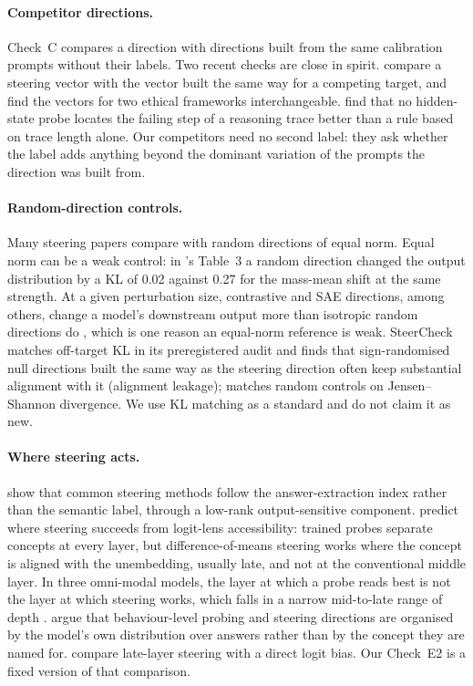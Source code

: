 \documentclass[11pt]{article}
\begin{document}
\paragraph{Competitor directions.} Check~C compares a direction with directions built from the same calibration prompts without their labels. Two recent checks are close in spirit. \citet{xu2026competing} compare a steering vector with the vector built the same way for a competing target, and find the vectors for two ethical frameworks interchangeable. \citet{subhnil2026failures} find that no hidden-state probe locates the failing step of a reasoning trace better than a rule based on trace length alone. Our competitors need no second label: they ask whether the label adds anything beyond the dominant variation of the prompts the direction was built from.

\paragraph{Random-direction controls.} Many steering papers compare with random directions of equal norm. Equal norm can be a weak control: in \citet{li2023iti}'s Table~3 a random direction changed the output distribution by a KL of 0.02 against 0.27 for the mass-mean shift at the same strength. At a given perturbation size, contrastive and SAE directions, among others, change a model's downstream output more than isotropic random directions do \citep{ferreiradasilva2026error}, which is one reason an equal-norm reference is weak. SteerCheck \citep{luo2026steercheck} matches off-target KL in its preregistered audit and finds that sign-randomised null directions built the same way as the steering direction often keep substantial alignment with it (alignment leakage); \citet{ferrara2026introspection} matches random controls on Jensen--Shannon divergence. We use KL matching as a standard and do not claim it as new.

\paragraph{Where steering acts.} \citet{gao2026steering} show that common steering methods follow the answer-extraction index rather than the semantic label, through a low-rank output-sensitive component. \citet{billa2026lap} predict where steering succeeds from logit-lens accessibility: trained probes separate concepts at every layer, but difference-of-means steering works where the concept is aligned with the unembedding, usually late, and not at the conventional middle layer. In three omni-modal models, the layer at which a probe reads best is not the layer at which steering works, which falls in a narrow mid-to-late range of depth \citep{wang2026readbest}. \citet{yu2026answerbasin} argue that behaviour-level probing and steering directions are organised by the model's own distribution over answers rather than by the concept they are named for. \citet{yuan2026specificity} compare late-layer steering with a direct logit bias. Our Check~E2 is a fixed version of that comparison.
\end{document}
